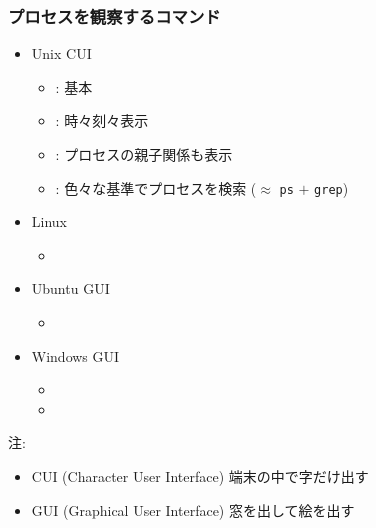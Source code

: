 \documentclass[12pt,dvipdfmx]{beamer}
\begin{document}
\begin{frame}
\frametitle{プロセスを観察するコマンド}
\begin{itemize}
\item Unix CUI
  \begin{itemize}
  \item {} : 基本
  \item {} : 時々刻々表示
  \item {} : プロセスの親子関係も表示
  \item {} : 色々な基準でプロセスを検索
    ($\approx$ {\tt ps} $+$ {\tt grep})
  \end{itemize}
\item Linux
  \begin{itemize}
  \item {}
  \end{itemize}
\item Ubuntu GUI
  \begin{itemize}
  \item {}
  \end{itemize}
\item Windows GUI
  \begin{itemize}
  \item {}
  \item {}
  \end{itemize}
\end{itemize}

注:
\begin{itemize}
\item CUI (Character User Interface) 端末の中で字だけ出す
\item GUI (Graphical User Interface) 窓を出して絵を出す
\end{itemize}
\end{frame}
\end{document}
